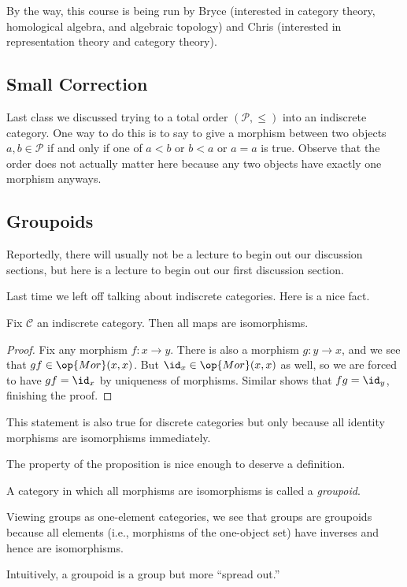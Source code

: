 \documentclass[../notes.tex]{subfiles}
\begin{document}

By the way, this course is being run by Bryce (interested in category theory, homological algebra, and algebraic topology) and Chris (interested in representation theory and category theory).

\subsection{Small Correction}
Last class we discussed trying to a total order $(\mathcal P,\le)$ into an indiscrete category. One way to do this is to say to give a morphism between two objects $a,b\in\mathcal P$ if and only if one of $a<b$ or $b<a$ or $a=a$ is true. Observe that the order does not actually matter here because any two objects have exactly one morphism anyways.

\subsection{Groupoids}
Reportedly, there will usually not be a lecture to begin out our discussion sections, but here is a lecture to begin out our first discussion section.

Last time we left off talking about indiscrete categories. Here is a nice fact.
\begin{proposition}
	Fix $\mathcal C$ an indiscrete category. Then all maps are isomorphisms.
\end{proposition}
\begin{proof}
	Fix any morphism $f:x\to y$. There is also a morphism $g:y\to x$, and we see that $gf\in\op{Mor}(x,x)$. But $\id_x\in\op{Mor}(x,x)$ as well, so we are forced to have $gf=\id_x$ by uniqueness of morphisms. Similar shows that $fg=\id_y$, finishing the proof.
\end{proof}
\begin{remark}
	This statement is also true for discrete categories but only because all identity morphisms are isomorphisms immediately.
\end{remark}
The property of the proposition is nice enough to deserve a definition.
\begin{definition}[Groupoid]
	A category in which all morphisms are isomorphisms is called a \textit{groupoid}.
\end{definition}
\begin{example}
	Viewing groups as one-element categories, we see that groups are groupoids because all elements (i.e., morphisms of the one-object set) have inverses and hence are isomorphisms.
\end{example}
Intuitively, a groupoid is a group but more ``spread out.''
\end{document}
